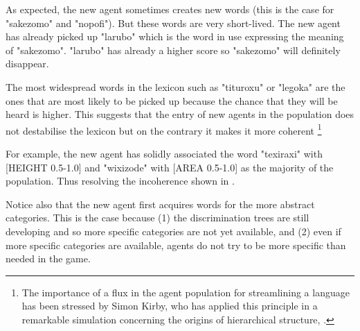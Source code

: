 As expected, the new 
agent sometimes creates new words (this is the case 
for "sakezomo" and "nopofi"). But these words are 
very short-lived. The new agent has already picked up 
"larubo" which is the word in use expressing the 
meaning of "sakezomo". "larubo" has already a higher 
score so "sakezomo" will definitely disappear. 

The most widespread words in the lexicon 
such as "tituroxu" or "legoka" are the ones that 
are most likely to be picked up because the chance
that they will be heard is higher. This suggests
that the entry of new agents in the population does
not destabilise the lexicon but on the contrary 
it makes it more coherent \footnote{The importance of a flux in the agent population for
streamlining a language has been stressed by Simon Kirby, who 
has applied this principle in a remarkable simulation 
concerning the origins of hierarchical structure, \cite{Kirby:1999}.}

For example, the new agent
has solidly associated the word "texiraxi" with 
[HEIGHT 0.5-1.0] and "wixizode" with [AREA 0.5-1.0]
as the majority of the population. Thus resolving the 
incoherence shown in . 

Notice also that the new agent first acquires words 
for the more abstract categories. This is the case 
because (1) the discrimination trees are still developing
and so more specific categories are not yet available, 
and (2) even if more specific categories are available, 
agents do not try to be more specific than needed in 
the game. 

